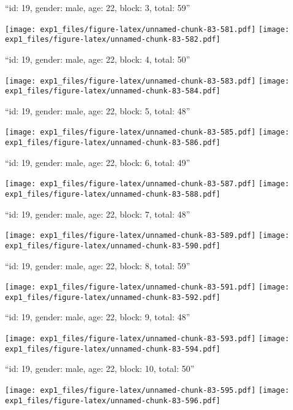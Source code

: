 \documentclass[11pt,,]{article}
\begin{document}
\newpage
[1] 

``id: 19, gender: male, age: 22, block: 3, total: 59''

\texttt{[image: exp1\_files/figure-latex/unnamed-chunk-83-581.pdf]}
\texttt{[image: exp1\_files/figure-latex/unnamed-chunk-83-582.pdf]}

\newpage
[1] 

``id: 19, gender: male, age: 22, block: 4, total: 50''

\texttt{[image: exp1\_files/figure-latex/unnamed-chunk-83-583.pdf]}
\texttt{[image: exp1\_files/figure-latex/unnamed-chunk-83-584.pdf]}

\newpage
[1] 

``id: 19, gender: male, age: 22, block: 5, total: 48''

\texttt{[image: exp1\_files/figure-latex/unnamed-chunk-83-585.pdf]}
\texttt{[image: exp1\_files/figure-latex/unnamed-chunk-83-586.pdf]}

\newpage
[1] 

``id: 19, gender: male, age: 22, block: 6, total: 49''

\texttt{[image: exp1\_files/figure-latex/unnamed-chunk-83-587.pdf]}
\texttt{[image: exp1\_files/figure-latex/unnamed-chunk-83-588.pdf]}

\newpage
[1] 

``id: 19, gender: male, age: 22, block: 7, total: 48''

\texttt{[image: exp1\_files/figure-latex/unnamed-chunk-83-589.pdf]}
\texttt{[image: exp1\_files/figure-latex/unnamed-chunk-83-590.pdf]}

\newpage
[1] 

``id: 19, gender: male, age: 22, block: 8, total: 59''

\texttt{[image: exp1\_files/figure-latex/unnamed-chunk-83-591.pdf]}
\texttt{[image: exp1\_files/figure-latex/unnamed-chunk-83-592.pdf]}

\newpage
[1] 

``id: 19, gender: male, age: 22, block: 9, total: 48''

\texttt{[image: exp1\_files/figure-latex/unnamed-chunk-83-593.pdf]}
\texttt{[image: exp1\_files/figure-latex/unnamed-chunk-83-594.pdf]}

\newpage
[1] 

``id: 19, gender: male, age: 22, block: 10, total: 50''

\texttt{[image: exp1\_files/figure-latex/unnamed-chunk-83-595.pdf]}
\texttt{[image: exp1\_files/figure-latex/unnamed-chunk-83-596.pdf]}
\end{document}
